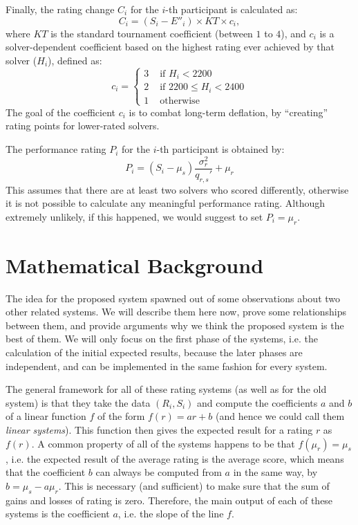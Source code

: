 \documentclass{article}
\newcommand{\artg}{\mu_r}
\newcommand{\ascr}{\mu_s}
\newcommand{\vrtg}{\sigma_r}
\newcommand{\cov}{q_{r,s}}
\theoremstyle{definition}
\begin{document}
Finally, the rating change $C_i$ for the $i$-th participant is calculated as:
\begin{equation}
C_i = (S_i - E''_i)\times KT\times c_i,
\end{equation}
where $KT$ is the standard tournament coefficient (between $1$ to $4$), and $c_i$ is a solver-dependent coefficient based on the highest rating ever achieved by that solver ($H_i$), defined as:
\begin{equation}
c_i=\begin{cases}
3&\text{ if } H_i<2200\\
2&\text{ if } 2200\leq H_i<2400\\
1&\text{ otherwise }
\end{cases}
\end{equation}
The goal of the coefficient $c_i$ is to combat long-term deflation, by ``creating'' rating points for lower-rated solvers.

The performance rating $P_i$ for the $i$-th participant is obtained by:
\begin{equation}
P_i = (S_i - \ascr) \frac{\vrtg^2}{\cov'} + \artg
\end{equation}
This assumes that there are at least two solvers who scored differently, otherwise it is not possible to calculate any meaningful performance rating.
Although extremely unlikely, if this happened, we would suggest to set $P_i=\artg$.

\section{Mathematical Background}
The idea for the proposed system spawned out of some observations about two other related systems.
We will describe them here now, prove some relationships between them, and provide arguments why we think the proposed system is the best of them.
We will only focus on the first phase of the systems, i.e. the calculation of the initial expected results, because the later phases are independent, and can be implemented in the same fashion for every system.

The general framework for all of these rating systems (as well as for the old system) is that they take the data $(R_i,S_i)$ and compute the coefficients $a$ and $b$ of a linear function $f$ of the form $f(r)=ar+b$ (and hence we could call them \emph{linear systems}).
This function then gives the expected result for a rating $r$ as $f(r)$.
A common property of all of the systems happens to be that $f(\artg)=\ascr$, i.e. the expected result of the average rating is the average score, which means that the coefficient $b$ can always be computed from $a$ in the same way, by $b=\ascr-a\artg$.
This is necessary (and sufficient) to make sure that the sum of gains and losses of rating is zero.
Therefore, the main output of each of these systems is the coefficient $a$, i.e. the slope of the line $f$.
\end{document}
